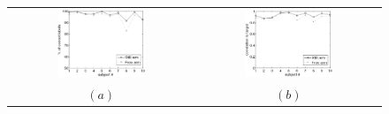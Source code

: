 \documentclass{article}
\begin{document}

\begin{figure}[!ht] \centering
  \begin{tabular}{cc}
    \includegraphics[width=0.50\textwidth]{perfClass.eps} &
    \includegraphics[width=0.50\textwidth]{perfRegr.eps} \\
    $(a)$ & $(b)$ \\
  \end{tabular}
\end{figure}
\end{document}
